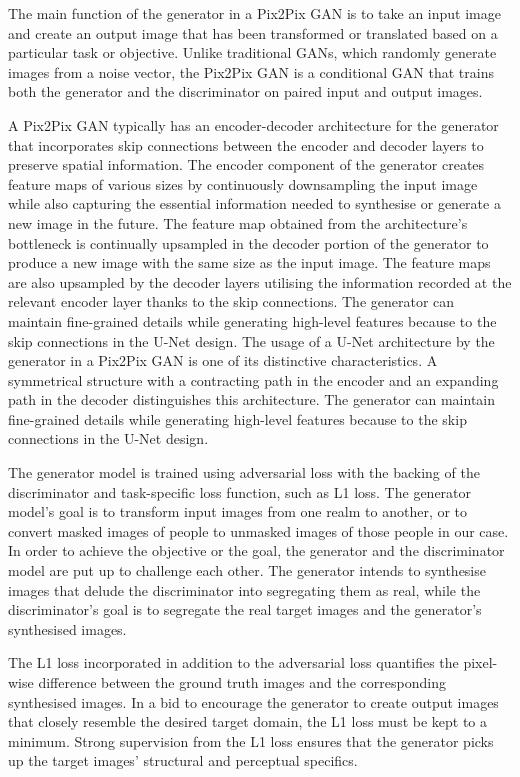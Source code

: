 \documentclass{36_styles/svproc}
\begin{document}
The main function of the generator in a Pix2Pix GAN is to take an input image and create an output image that has been transformed or translated based on a particular task or objective. Unlike traditional GANs, which randomly generate images from a noise vector, the Pix2Pix GAN is a conditional GAN that trains both the generator and the discriminator on paired input and output images.

A Pix2Pix GAN typically has an encoder-decoder architecture for the generator that incorporates skip connections between the encoder and decoder layers to preserve spatial information. The encoder component of the generator creates feature maps of various sizes by continuously downsampling the input image while also capturing the essential information needed to synthesise or generate a new image in the future. The feature map obtained from the architecture's bottleneck is continually upsampled in the decoder portion of the generator to produce a new image with the same size as the input image. The feature maps are also upsampled by the decoder layers utilising the information recorded at the relevant encoder layer thanks to the skip connections. The generator can maintain fine-grained details while generating high-level features because to the skip connections in the U-Net design. The usage of a U-Net architecture by the generator in a Pix2Pix GAN is one of its distinctive characteristics. A symmetrical structure with a contracting path in the encoder and an expanding path in the decoder distinguishes this architecture. The generator can maintain fine-grained details while generating high-level features because to the skip connections in the U-Net design.

The generator model is trained using adversarial loss with the backing of the discriminator and task-specific loss function, such as L1 loss. The generator model's goal is to transform input images from one realm to another, or to convert masked images of people to unmasked images of those people in our case. In order to achieve the objective or the goal, the generator and the discriminator model are put up to challenge each other. The generator intends to synthesise images that delude the discriminator into segregating them as real, while the discriminator's goal is to segregate the real target images and the generator's synthesised images.

The L1 loss incorporated in addition to the adversarial loss quantifies the pixel-wise difference between the ground truth images and the corresponding synthesised images. In a bid to encourage the generator to create output images that closely resemble the desired target domain, the L1 loss must be kept to a minimum. Strong supervision from the L1 loss ensures that the generator picks up the target images' structural and perceptual specifics.
\end{document}
